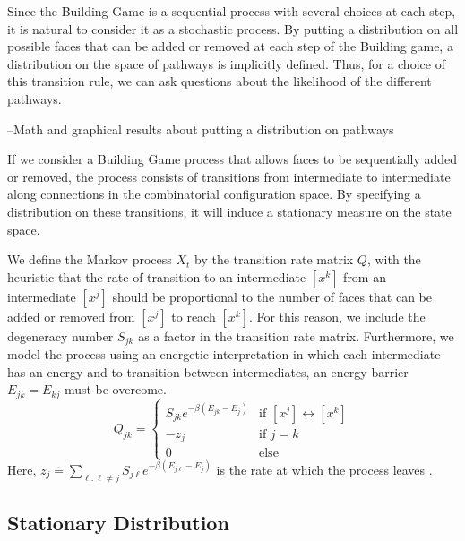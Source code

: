 Since the Building Game is a sequential process with several choices at each step, it is natural to consider it as a stochastic process. By putting a distribution on all possible faces that can be added or removed at each step of the Building game, a distribution on the space of pathways is implicitly defined. Thus, for a choice of this transition rule, we can ask questions about the likelihood of the different pathways. 

--Math and graphical results about putting a distribution on pathways


If we consider a Building Game process that allows faces to be sequentially added or removed, the process consists of transitions from intermediate to intermediate along connections in the combinatorial configuration space. By specifying a distribution on these transitions, it will induce a stationary measure on the state space.  

We define the Markov process $X_t$ by the transition rate matrix $Q$, with the heuristic that the rate of transition to an intermediate $[x^k]$ from an intermediate $[x^j]$ should be proportional to the number of faces that can be added or removed from $[x^j]$ to reach $[x^k]$. For this reason, we include the degeneracy number $S_{jk}$ as a factor in the transition rate matrix. Furthermore, we model the process using an energetic interpretation in which each intermediate has an energy and to transition between intermediates, an energy barrier $E_{jk} = E_{kj}$ must be overcome. 
\[
  Q_{jk} =
  \begin{cases}
   S_{jk}e^{-\beta\left(E_{jk} - E_{j}\right)} & \text{if } [x^j] \leftrightarrow [x^k]  \\
   -z_j       & \text{if } j = k \\
   0 & \text{else}
  \end{cases}
\]
Here, $z_j \doteq \sum_{\ell: \ell \neq j} S_{j\ell}e^{-\beta\left(E_{j\ell} - E_j\right)}$ is the rate at which the process leaves \xj. 

\subsection{Stationary Distribution}

